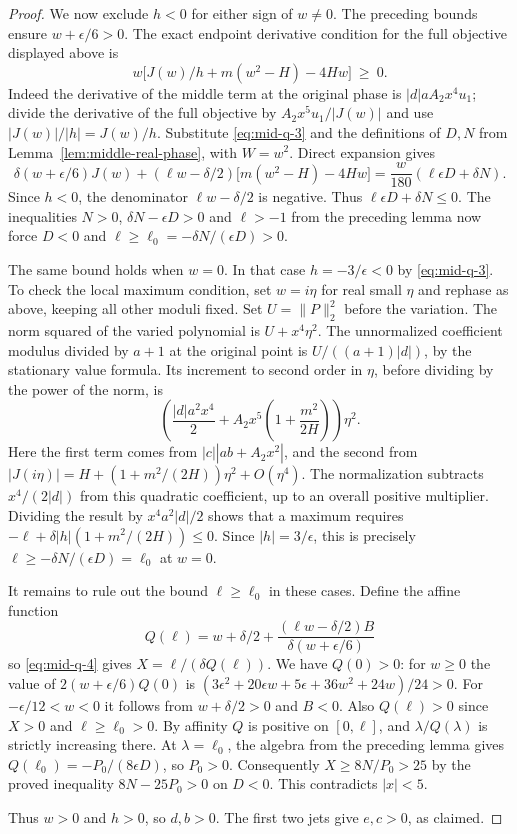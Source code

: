 \documentclass[11pt]{article}
\begin{document}
\begin{proof}
We now exclude \(h<0\) for either sign of \(w\ne0\).
The preceding bounds ensure \(w+\epsilon/6>0\).
The exact endpoint derivative condition for the full objective
displayed above is
\[
 w\bigl[J(w)/h + m(w^2-H)-4Hw\bigr]\ \geq\ 0.
\]
Indeed the derivative of the middle term at the original
phase is \(|d|aA_2x^4 u_1\); divide the derivative of the
full objective by \(A_2x^5 u_1/|J(w)|\) and use
\(|J(w)|/|h|=J(w)/h\).
Substitute \eqref{eq:mid-q-3} and the definitions of \(D,N\)
from Lemma~\ref{lem:middle-real-phase}, with \(W=w^2\).
Direct expansion gives
\[
 \delta(w+\epsilon/6)J(w)
  +(\ell w-\delta/2)\bigl[m(w^2-H)-4Hw\bigr]
     =\frac{w}{180}(\ell\epsilon D+\delta N).
\]
Since \(h<0\), the denominator \(\ell w-\delta/2\) is negative.
Thus \(\ell\epsilon D+\delta N\le0\).
The inequalities \(N>0\), \(\delta N-\epsilon D>0\) and
\(\ell>-1\) from the preceding lemma now force
\(D<0\) and \(\ell\ge\ell_0=-\delta N/(\epsilon D)>0\).

The same bound holds when \(w=0\). In that case
\(h=-3/\epsilon<0\) by \eqref{eq:mid-q-3}.
To check the local maximum condition, set \(w=i\eta\)
for real small \(\eta\) and rephase as above, keeping all
other moduli fixed. Set \(U=\|P\|_2^2\) before the variation.
The norm squared of the varied polynomial is \(U+x^4\eta^2\).
The unnormalized coefficient modulus divided by \(a+1\)
at the original point is \(U/((a+1)|d|)\), by the stationary
value formula. Its increment to second order in \(\eta\),
before dividing by the power of the norm, is
\[
 \left(\frac{|d|a^2x^4}{2}
       +A_2x^5\left(1+\frac{m^2}{2H}\right)\right)\eta^2.
\]
Here the first term comes from
\(|c||ab+A_2x^2|\), and the second from
\(|J(i\eta)|=H+(1+m^2/(2H))\eta^2+O(\eta^4)\).
The normalization subtracts \(x^4/(2|d|)\) from this
quadratic coefficient, up to an overall positive multiplier.
Dividing the result by \(x^4a^2|d|/2\) shows that a maximum
requires \(-\ell+\delta|h|(1+m^2/(2H))\leq0\).
Since \(|h|=3/\epsilon\), this is precisely
\(\ell\ge-\delta N/(\epsilon D)=\ell_0\) at \(w=0\).

It remains to rule out the bound \(\ell\ge\ell_0\) in these
cases. Define the affine function
\[
 Q(\ell)=w+\delta/2+
       \frac{(\ell w-\delta/2)B}{\delta(w+\epsilon/6)}
\]
so \eqref{eq:mid-q-4} gives \(X=\ell/(\delta Q(\ell))\).
We have \(Q(0)>0\): for \(w\ge0\) the value of
\(2(w+\epsilon/6)Q(0)\) is
\((3\epsilon^2+20\epsilon w+5\epsilon+36w^2+24w)/24>0\).
For \(-\epsilon/12<w<0\) it follows from
\(w+\delta/2>0\) and \(B<0\).
Also \(Q(\ell)>0\) since \(X>0\) and \(\ell\ge\ell_0>0\).
By affinity \(Q\) is positive on \([0,\ell]\), and
\(\lambda/Q(\lambda)\) is strictly increasing there.
At \(\lambda=\ell_0\), the algebra from the preceding
lemma gives \(Q(\ell_0)=-P_0/(8\epsilon D)\), so \(P_0>0\).
Consequently \(X\ge8N/P_0>25\) by the proved inequality
\(8N-25P_0>0\) on \(D<0\). This contradicts \(|x|<5\).

Thus \(w>0\) and \(h>0\), so \(d,b>0\).
The first two jets give \(e,c>0\), as claimed.
\end{proof}
\end{document}
